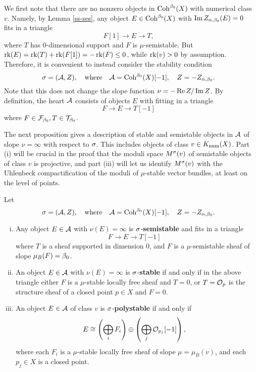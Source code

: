 We first note that there are no nonzero objects in $\operatorname{\mathrm{Coh}}^{\beta_0}(X)$ with numerical class $v$. Namely, by Lemma \ref{ss-ses}, any object $E \in \operatorname{\mathrm{Coh}}^{\beta_0}(X)$ with $\operatorname{\mathrm{Im}} Z_{\alpha,\beta_0}(E) = 0$ fits in a triangle
\[ F[1] \to E \to T, \]
where $T$ has 0-dimensional support and $F$ is $\mu$-semistable. But $\operatorname{\mathrm{rk}}(E) = \operatorname{\mathrm{rk}}(T) + \operatorname{\mathrm{rk}}(F[1]) = -\operatorname{\mathrm{rk}}(F) \le 0$, while $\operatorname{\mathrm{rk}}(v) > 0$ by assumption. Therefore, it is convenient to instead consider the stability condition 
\[ \sigma = (\mathcal{A}, Z), \quad \mathrm{where} \quad \mathcal{A} = \operatorname{\mathrm{Coh}}^{\beta_0}(X)[-1], \quad Z = -Z_{\alpha,\beta_0}. \] 
Note that this does not change the slope function $\nu = -\operatorname{\mathrm{Re}} Z/\operatorname{\mathrm{Im}} Z$. By definition, the heart $\mathcal{A}$ consists of objects $E$ with fitting in a triangle
\[ F \to E \to T[-1] \]
where $F \in \mathcal{F}_{\beta_0}, T \in \mathcal{T}_{\beta_0}$.

The next proposition gives a description of stable and semistable objects in $\mathcal{A}$ of slope $\nu = \infty$ with respect to $\sigma$. This includes objects of class $v \in K_{\mathrm{num}}(X)$. Part (i) will be crucial in the proof that the moduli space $M^\sigma(v)$ of semistable objects of class $v$ is projective, and part (iii) will let us identify $M^\sigma(v)$ with the Uhlenbeck compactification of the moduli of $\mu$-stable vector bundles, at least on the level of points.
\begin{prop}\label{ss-object-vertical-classification}
    Let 
    \[ \sigma = (\mathcal{A}, Z), \quad \mathrm{where} \quad \mathcal{A} = \operatorname{\mathrm{Coh}}^{\beta_0}(X)[-1], \quad Z = -Z_{\alpha,\beta_0}. \]
    \begin{enumerate}[(i)]
        \item Any object $E \in \mathcal{A}$ with $\nu(E) = \infty$ is $\sigma$-{\bf semistable} and fits in a triangle
        \[ F \to E \to T[-1] \]
        where $T$ is a sheaf supported in dimension 0, and $F$ is a $\mu$-semistable sheaf of slope $\mu_B(F) = \beta_0$. 
        \item An object $E \in \mathcal{A}$ with $\nu(E) = \infty$ is $\sigma$-{\bf stable} if and only if in the above triangle either $F$ is a $\mu$-stable locally free sheaf and $T = 0$, or $T = \mathcal{O}_p$ is the structure sheaf of a closed point $p \in X$ and $F = 0$.
        \item An object $E \in \mathcal{A}$ of class $v$ is $\sigma$-{\bf polystable} if and only if
        \[ E \cong \left(\bigoplus_i F_i\right) \oplus \left(\bigoplus_j \mathcal{O}_{p_j}[-1]\right), \]
        where each $F_i$ is a $\mu$-stable locally free sheaf of slope $\mu = \mu_B(v)$, and each $p_j \in X$ is a closed point.
    \end{enumerate}
\end{prop}
